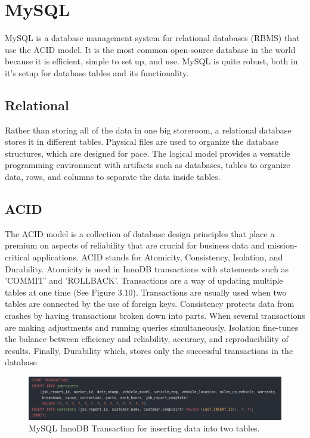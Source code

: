 \section{MySQL}
MySQL is a database management system for relational databases (RBMS) that use the ACID model. It is the most common open-source database in the world because it is efficient, simple to set up, and use. \cite{ref11} MySQL is quite robust, both in it's setup for database tables and its functionality.
 
\subsection{Relational}
Rather than storing all of the data in one big storeroom, a relational database stores it in different tables. Physical files are used to organize the database structures, which are designed for pace. The logical model provides a versatile programming environment with artifacts such as databases, tables to organize data, rows, and columns to separate the data inside tables. \cite{ref12}
 
\subsection{ACID}
The ACID model is a collection of database design principles that place a premium on aspects of reliability that are crucial for business data and mission-critical applications. ACID stands for Atomicity, Consistency, Isolation, and Durability. Atomicity is used in InnoDB transactions with statements such as 'COMMIT' and 'ROLLBACK'. Transactions are a way of updating multiple tables at one time (See Figure 3.10). Transactions are usually used when two tables are connected by the use of foreign keys. Consistency protects data from crashes by having transactions broken down into parts. When several transactions are making adjustments and running queries simultaneously, Isolation fine-tunes the balance between efficiency and reliability, accuracy, and reproducibility of results. Finally, Durability which, stores only the successful transactions in the database. \cite{ref13}
 
 \begin{figure}[H]
    \caption{MySQL InnoDB Transaction for inserting data into two tables.}
    \label{image:transaction}
    \centering
    \includegraphics[width=1.0\textwidth]{images/misc/mysql-transation.png}
\end{figure}

